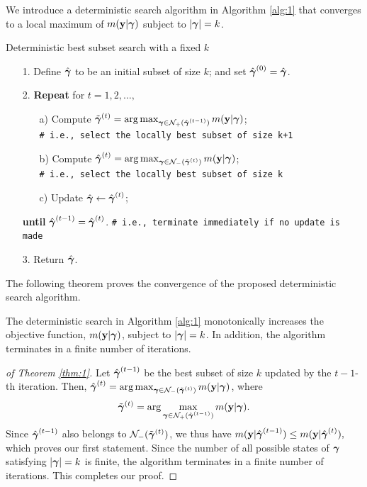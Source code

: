 We introduce a deterministic search algorithm in Algorithm \ref{alg:1} that converges to a local maximum of $m({\bf y}|{\boldsymbol \gamma})$ subject to $|{\boldsymbol \gamma}|=k$.
\begin{algorithm}[H]
\caption{Deterministic best subset search with a fixed $k$}\label{alg:1}
\begin{itemize}\itemsep=0pt
\item[1.] Define $\hat{{\boldsymbol \gamma}}$ to be an initial subset of size $k$; and set $\hat{{\boldsymbol \gamma}}^{(0)}=\hat{{\boldsymbol \gamma}}$.
\item[2.] \textbf{Repeat} for $t=1,2,\ldots,$
\begin{itemize}\itemsep=0pt
\item[a)] Compute $\tilde{{\boldsymbol \gamma}}^{(t)} = \arg\max_{{\boldsymbol \gamma}  \in \mathcal{N}_+(\hat{{\boldsymbol \gamma}}^{(t-1)} ) } m({\bf y}|{\boldsymbol \gamma})$;\\ \texttt{\# i.e., select the locally best subset of size k+1} 
\item[b)] Compute $\hat{{\boldsymbol \gamma}}^{(t)}=  \arg\max_{{\boldsymbol \gamma}  \in \mathcal{N}_-(\tilde{{\boldsymbol \gamma}}^{(t)} ) } m({\bf y}|{\boldsymbol \gamma})$;\\ \texttt{\# i.e., select the locally best subset of size k} 
\item[c)] Update $\hat{{\boldsymbol \gamma}}\leftarrow \hat{{\boldsymbol \gamma}}^{(t)}$; 
\end{itemize}
\item[] \textbf{until} $\hat{{\boldsymbol \gamma}}^{(t-1)}=\hat{{\boldsymbol \gamma}}^{(t)}$. \texttt{\# i.e., terminate immediately if no update is made}
\item[3.] Return $\hat{{\boldsymbol \gamma}}$.
\end{itemize}
\end{algorithm}
The following theorem proves the convergence of the proposed deterministic search algorithm.
\begin{theorem}\label{thm:1} The deterministic search in Algorithm \ref{alg:1} monotonically increases the objective function, $m({\bf y}|{\boldsymbol \gamma})$, subject to $|{\boldsymbol \gamma}|=k$. In addition, the algorithm terminates in a finite number of iterations.
\end{theorem}
\begin{proof}[of Theorem \ref{thm:1}] Let $\hat{{\boldsymbol \gamma}}^{(t-1)}$ be the best subset of size $k$ updated by the ${t-1}$-th iteration. Then, $\hat{{\boldsymbol \gamma}}^{(t)} = \arg\max_{{\boldsymbol \gamma}  \in \mathcal{N}_-(\tilde{{\boldsymbol \gamma}}^{(t)} ) } m({\bf y}|{\boldsymbol \gamma})$, where $$\tilde{{\boldsymbol \gamma}}^{(t)}=\arg\max_{{\boldsymbol \gamma}  \in \mathcal{N}_+(\hat{{\boldsymbol \gamma}}^{(t-1)}  ) } m({\bf y}|{\boldsymbol \gamma}).$$ Since $\hat{{\boldsymbol \gamma}}^{(t-1)}$ also belongs to $ \mathcal{N}_-(\tilde{{\boldsymbol \gamma}}^{(t)} ) $, we thus have $m({\bf y}|\hat{{\boldsymbol \gamma}}^{(t-1)} ) \leq m({\bf y}|\hat{{\boldsymbol \gamma}}^{(t)}),$ which proves our first statement. Since the number of all possible states of ${\boldsymbol \gamma}$ satisfying $|{\boldsymbol \gamma}|=k$ is finite, the algorithm terminates in a finite number of iterations. This completes our proof.
\end{proof}
